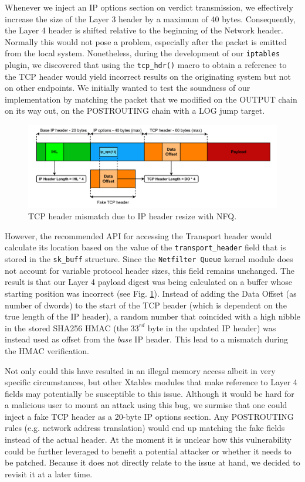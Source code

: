 Whenever we inject an IP options section on verdict transmission, we effectively increase the size of the Layer 3 header by a maximum of 40 bytes. Consequently, the Layer 4 header is shifted relative to the beginning of the Network header. Normally this would not pose a problem, especially after the packet is emitted from the local system. Nonetheless, during the development of our \texttt{iptables} plugin, we discovered that using the \texttt{tcp\_hdr()} macro to obtain a reference to the TCP header would yield incorrect results on the originating system but not on other endpoints. We initially wanted to test the soundness of our implementation by matching the packet that we modified on the OUTPUT chain on its way out, on the POSTROUTING chain with a LOG jump target.

\begin{figure}
    \centering
    \includegraphics[width=\textwidth,keepaspectratio]{figures/daf-nfq-bug.pdf}
    \caption{TCP header mismatch due to IP header resize with NFQ.}
    \label{appfw:daf:fig:nfq-bug}
\end{figure}

However, the recommended API for accessing the Transport header would calculate its location based on the value of the \texttt{transport\_header} field that is stored in the \texttt{sk\_buff} structure. Since the \texttt{Netfilter Queue} kernel module does not account for variable protocol header sizes, this field remains unchanged. The result is that our Layer 4 payload digest was being calculated on a buffer whose starting position was incorrect (see Fig. \ref{appfw:daf:fig:nfq-bug}). Instead of adding the Data Offset (as number of dwords) to the start of the TCP header (which is dependent on the true length of the IP header), a random number that coincided with a high nibble in the stored SHA256 HMAC (the $33^{rd}$ byte in the updated IP header) was instead used as offset from the \textit{base} IP header. This lead to a mismatch during the HMAC verification.

Not only could this have resulted in an illegal memory access albeit in very specific circumstances, but other Xtables modules that make reference to Layer 4 fields may potentially be susceptible to this issue. Although it would be hard for a malicious user to mount an attack using this bug, we surmise that one could inject a fake TCP header as a 20-byte IP options section. Any POSTROUTING rules (e.g. network address translation) would end up matching the fake fields instead of the actual header. At the moment it is unclear how this vulnerability could be further leveraged to benefit a potential attacker or whether it needs to be patched. Because it does not directly relate to the issue at hand, we decided to revisit it at a later time.

